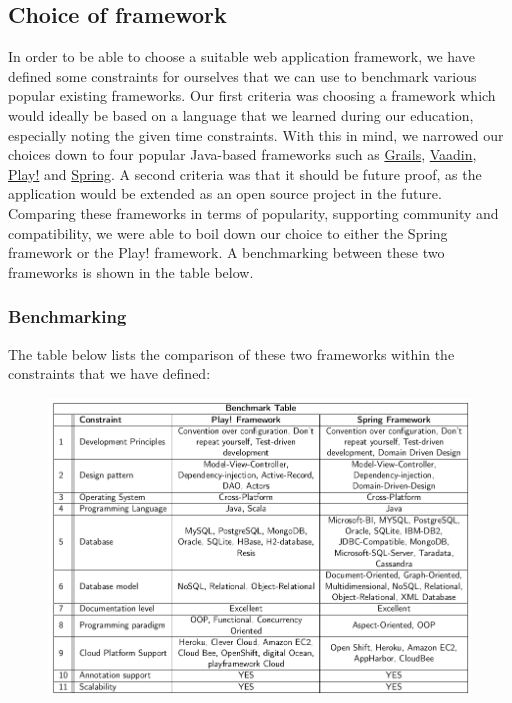 \subsection{Choice of framework}
In order to be able to choose a suitable web application framework, we have defined some constraints for ourselves that we can use to benchmark various popular existing frameworks. Our first criteria was choosing a framework which would ideally be based on a language that we learned during our education, especially noting the given time constraints. With this in mind, we narrowed our choices down to four popular Java-based frameworks such as \href{https://grails.org/}{Grails}, \href{https://vaadin.com/home}{Vaadin}, \href{https://www.playframework.com/}{Play!} and \href{http://projects.spring.io/spring-framework/}{Spring}. A second criteria was that it should be future proof, as the application would be extended as an open source project in the future. Comparing these frameworks in terms of popularity, supporting community and compatibility, we were able to boil down our choice to either the Spring framework or the Play! framework. A benchmarking between these two frameworks is shown in the table below.
\subsubsection{Benchmarking}
 The table below lists the comparison of these two frameworks within the constraints that we have defined:\\

\begin{figure}[h]
\centering
\includegraphics[scale=0.5]{./img/benchmark.png}	
\end{figure}


